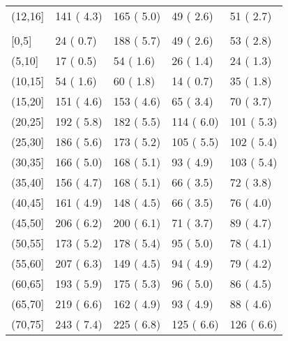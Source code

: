\documentclass[
  a4paper,
  openany]{article}
\begin{document}
\begin{longtable}[t]{lllll}
\hspace{1em}(12,16] & 141 ( 4.3) & 165 ( 5.0) & 49 ( 2.6) & 51 ( 2.7)\\
\rowcolor{gray!6}  \addlinespace[0.3em]
\multicolumn{5}{l}{\textbf{Patient age in years n (\%)}}\\
\hspace{1em}[0,5] & 24 ( 0.7) & 188 ( 5.7) & 49 ( 2.6) & 53 ( 2.8)\\
\hspace{1em}(5,10] & 17 ( 0.5) & 54 ( 1.6) & 26 ( 1.4) & 24 ( 1.3)\\
\rowcolor{gray!6}  \hspace{1em}(10,15] & 54 ( 1.6) & 60 ( 1.8) & 14 ( 0.7) & 35 ( 1.8)\\
\hspace{1em}(15,20] & 151 ( 4.6) & 153 ( 4.6) & 65 ( 3.4) & 70 ( 3.7)\\
\rowcolor{gray!6}  \hspace{1em}(20,25] & 192 ( 5.8) & 182 ( 5.5) & 114 ( 6.0) & 101 ( 5.3)\\
\hspace{1em}(25,30] & 186 ( 5.6) & 173 ( 5.2) & 105 ( 5.5) & 102 ( 5.4)\\
\rowcolor{gray!6}  \hspace{1em}(30,35] & 166 ( 5.0) & 168 ( 5.1) & 93 ( 4.9) & 103 ( 5.4)\\
\hspace{1em}(35,40] & 156 ( 4.7) & 168 ( 5.1) & 66 ( 3.5) & 72 ( 3.8)\\
\rowcolor{gray!6}  \hspace{1em}(40,45] & 161 ( 4.9) & 148 ( 4.5) & 66 ( 3.5) & 76 ( 4.0)\\
\hspace{1em}(45,50] & 206 ( 6.2) & 200 ( 6.1) & 71 ( 3.7) & 89 ( 4.7)\\
\rowcolor{gray!6}  \hspace{1em}(50,55] & 173 ( 5.2) & 178 ( 5.4) & 95 ( 5.0) & 78 ( 4.1)\\
\hspace{1em}(55,60] & 207 ( 6.3) & 149 ( 4.5) & 94 ( 4.9) & 79 ( 4.2)\\
\rowcolor{gray!6}  \hspace{1em}(60,65] & 193 ( 5.9) & 175 ( 5.3) & 96 ( 5.0) & 86 ( 4.5)\\
\hspace{1em}(65,70] & 219 ( 6.6) & 162 ( 4.9) & 93 ( 4.9) & 88 ( 4.6)\\
\rowcolor{gray!6}  \hspace{1em}(70,75] & 243 ( 7.4) & 225 ( 6.8) & 125 ( 6.6) & 126 ( 6.6)\\

\end{longtable}
\end{document}
